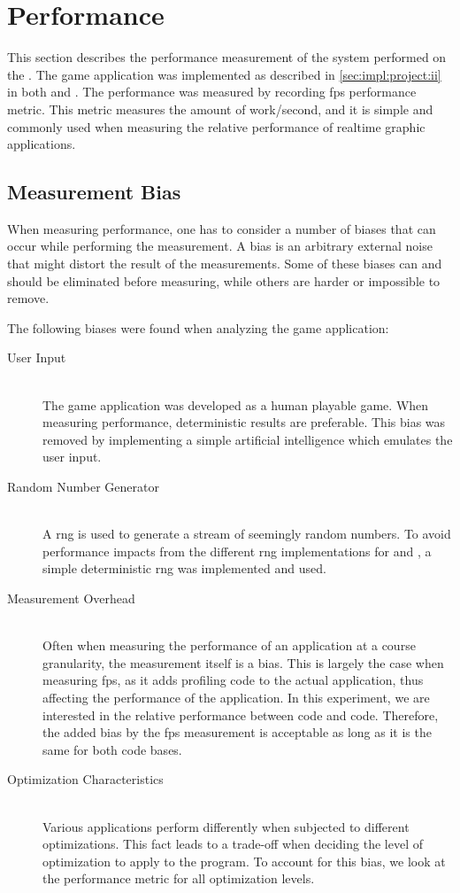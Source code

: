 
\section{Performance}
\label{sec:res:perf}

This section describes the performance measurement of the system performed on the {\DK}.
The game application was implemented as described in \autoref{sec:impl:project:ii} in both {\C} and {\rust}.
The performance was measured by recording \gls{fps} performance metric.
This metric measures the amount of work/second, and it is simple and commonly used when measuring the relative performance of realtime graphic applications.

\subsection{Measurement Bias}
\label{sec:perf:bias}

When measuring performance, one has to consider a number of biases that can occur while performing the measurement.
A bias is an arbitrary external noise that might distort the result of the measurements.
Some of these biases can and should be eliminated before measuring, while others are harder or impossible to remove.

The following biases were found when analyzing the game application:
\begin{description}
  \item [User Input] \hfill \\
The game application was developed as a human playable game.
When measuring performance, deterministic results are preferable.
This bias was removed by implementing a simple artificial intelligence which emulates the user input.

  \item [Random Number Generator] \hfill \\
A \gls{rng} is used to generate a stream of seemingly random numbers.
To avoid performance impacts from the different \gls{rng} implementations for {\C} and {\rust,} a simple deterministic \gls{rng} was implemented and used.

  \item [Measurement Overhead] \hfill \\
Often when measuring the performance of an application at a course granularity, the measurement itself is a bias.
This is largely the case when measuring \gls{fps}, as it adds profiling code to the actual application, thus affecting the performance of the application.
In this experiment, we are interested in the relative performance between {\C} code and {\rust} code.
Therefore, the added bias by the \gls{fps} measurement is acceptable as long as it is the same for both code bases.

  \item [Optimization Characteristics] \hfill \\
Various applications perform differently when subjected to different optimizations.
This fact leads to a trade-off when deciding the level of optimization to apply to the program.
To account for this bias, we look at the performance metric for all optimization levels.
\end{description}

